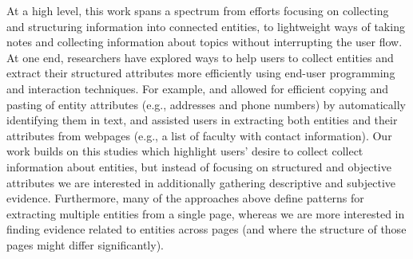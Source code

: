 

At a high level, this work spans a spectrum from efforts focusing on collecting and structuring information into connected entities, to lightweight ways of taking notes and collecting information about topics without interrupting the user flow. At one end, researchers have explored ways to help users to collect entities and extract their structured attributes more efficiently using end-user programming and interaction techniques. For example, \cite{bier2006entity} and \cite{stylos2004citrine} allowed for efficient copying and pasting of entity attributes  (e.g., addresses and phone numbers) by automatically identifying them in text, and \cite{thresher,huynh2005piggy,dontcheva2006collecting} assisted users in extracting both entities and their attributes from webpages (e.g., a list of faculty with contact information). Our work builds on this studies which highlight users' desire to collect collect information about entities, but instead of focusing on structured and objective attributes we are interested in additionally gathering descriptive and subjective evidence. Furthermore, many of the approaches above define patterns for extracting multiple entities from a single page, whereas we are more interested in finding evidence related to entities across pages (and where the structure of those pages might differ significantly).

